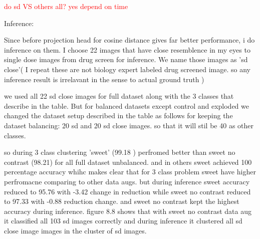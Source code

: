 \textcolor{red}{do sd VS others all? yes depend on time}

Inference:



Since before projection head for cosine distance gives far better performance, i do  inference on them. I choose 22 images that have close resemblence in my eyes 
to single dose images from drug screen for inference. We name those images as 'sd close'( I repeat these are not biology expert labeled drug screened image. so any inference result is irrelavant
 in the sense to actual ground truth )

we used all 22 sd close images for full dataset along with the 3 classes that describe in the table. But for balanced datasets except control and exploded
 we changed the  dataset setup described in the table as follows for keeping the dataset balancing: 20 sd and 20 sd close images. so that it will stil be 40 as other classes.



 so during 3 class clustering 'sweet' (99.18 ) perfromed better than sweet no contrast (98.21) for all full dataset unbalanced. and in others sweet achieved 100 percentage accuracy
 whihc makes clear that for 3 class problem sweet have higher perfromacne comparing to other data augs. but during inference sweet accuracy reduced to 95.76  with -3.42 
 change in reduction while sweet no contrast reduced to  97.33 with -0.88 reduction change. and sweet no contrast kept the highest accuracy during inference. figure 8.8 shows that 
 with sweet no contrast data aug it classified all 103 sd images correctly and during inference it clustered all sd close image images in the cluster of sd images.
 
 

 \begin{table}[H]
    \centering
    \caption{Evaluation Results on COSINE}
    \label{tab:professional_table}
\end{table}

